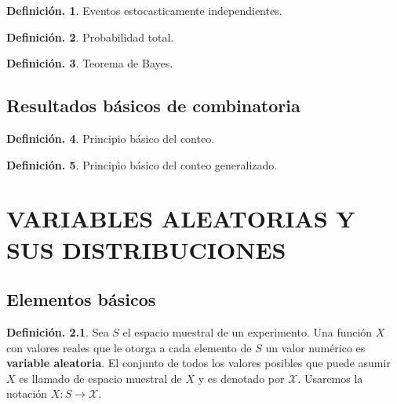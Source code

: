 \documentclass[]{book}
\theoremstyle{definition}
\newtheorem{definition}{Definición.}[chapter]
\theoremstyle{definition}
\theoremstyle{definition}
\theoremstyle{remark}
\begin{document}
\begin{definition}
\protect\hypertarget{def:unnamed-chunk-124}{}{\label{def:unnamed-chunk-124} }Eventos estocasticamente independientes.
\end{definition}

\begin{definition}
\protect\hypertarget{def:unnamed-chunk-125}{}{\label{def:unnamed-chunk-125} }Probabilidad total.
\end{definition}

\begin{definition}
\protect\hypertarget{def:unnamed-chunk-126}{}{\label{def:unnamed-chunk-126} }Teorema de Bayes.
\end{definition}

\hypertarget{resultados-buxe1sicos-de-combinatoria}{%
\section{Resultados básicos de combinatoria}\label{resultados-buxe1sicos-de-combinatoria}}

\begin{definition}
\protect\hypertarget{def:unnamed-chunk-127}{}{\label{def:unnamed-chunk-127} }Principio básico del conteo.
\end{definition}

\begin{definition}
\protect\hypertarget{def:unnamed-chunk-128}{}{\label{def:unnamed-chunk-128} }Principio básico del conteo generalizado.
\end{definition}

\hypertarget{var}{%
\chapter{VARIABLES ALEATORIAS Y SUS DISTRIBUCIONES}\label{var}}

\hypertarget{elementos-buxe1sicos}{%
\section{Elementos básicos}\label{elementos-buxe1sicos}}

\begin{definition}
\protect\hypertarget{def:unnamed-chunk-129}{}{\label{def:unnamed-chunk-129} }Sea \(S\) el espacio muestral de un experimento. Una función \(X\) con valores reales que le otorga a cada elemento de \(S\) un valor numérico es \textbf{variable aleatoria}. El conjunto de todos los valores posibles que puede asumir \(X\) es llamado de espacio muestral de \(X\) y es denotado por \(\mathcal{X}\). Usaremos la notación \(X:S\to \mathcal{X}\).
\end{definition}
\end{document}
